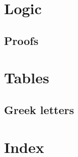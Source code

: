 \chapter{Logic}
\section{Proofs}
\appendix
\chapter{Tables}
\section{Greek letters}
\backmatter
\chapter{Index}\label{ch:index}
